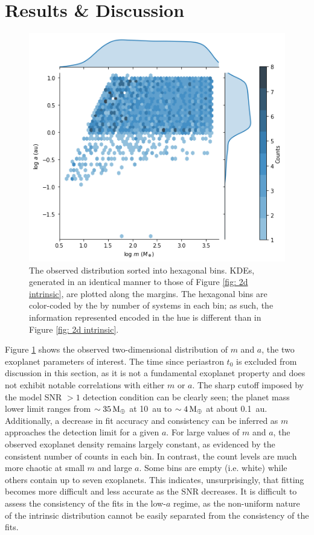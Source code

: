 \documentclass[12pt,manuscript]{aastex}
\begin{document}
\FloatBarrier
\section{Results \& Discussion}
\label{section: results}

\begin{figure}[ht]
  \centering
  \includegraphics[width=0.7\linewidth]{../figures/planets3_observed}
  \caption{The observed distribution sorted into hexagonal bins. KDEs, generated in an identical manner to those of Figure \ref{fig: 2d intrinsic}, are plotted along the margins. The hexagonal bins are color-coded by the by number of systems in each bin; as such, the information represented encoded in the hue is different than in Figure \ref{fig: 2d intrinsic}.}
  \label{fig: 2d observed}
\end{figure}

Figure \ref{fig: 2d observed} shows the observed two-dimensional distribution of $m$ and $a$, the two exoplanet parameters of interest. 
The time since periastron $t_0$ is excluded from discussion in this section, as it is not a fundamental exoplanet property and does not exhibit notable correlations with either $m$ or $a$. 
The sharp cutoff imposed by the model SNR $ > 1$ detection condition can be clearly seen; the planet mass lower limit ranges from $\sim \SI{35}{M_\oplus}$ at \SI{10}{au} to $\sim \SI{4}{M_\oplus}$ at about \SI{0.1}{au}.
Additionally, a decrease in fit accuracy and consistency can be inferred as $m$ approaches the detection limit for a given $a$. 
For large values of $m$ and $a$, the observed exoplanet density remains largely constant, as evidenced by the consistent number of counts in each bin. 
In contrast, the count levels are much more chaotic at small $m$ and large $a$.
Some bins are empty (i.e. white) while others contain  up to seven exoplanets.
This indicates, unsurprisingly, that fitting becomes more difficult and less accurate as the SNR decreases.
It is difficult to assess the consistency of the fits in the low-$a$ regime, as the non-uniform nature of the intrinsic distribution cannot be easily separated from the consistency of the fits.
\end{document}
